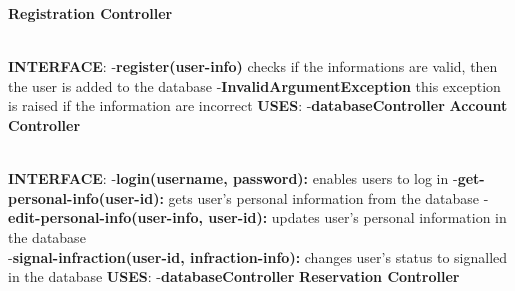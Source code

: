 \documentclass{article}
\begin{document}
\textbf{Registration Controller}\\
\begin{figure}[ht]
\end{figure}\\
\textbf{INTERFACE}: 
 \newline
-\textbf{register(user-info)} checks if the informations are valid, then the user is added to the database  
\newline
-\textbf{InvalidArgumentException} this exception is raised if the 	information are incorrect  
\newline
\textbf{USES}:   
\newline
-\textbf{databaseController}
\newpage
\textbf{Account Controller}\\
\begin{figure}[ht]
\end{figure}\\
\textbf{INTERFACE}: 
 \newline
-\textbf{login(username, password):} enables users to log in   
\newline
-\textbf{get-personal-info(user-id):} gets user's personal information from the database 
\newline
-\textbf{edit-personal-info(user-info, user-id):} updates user's personal information in the database \\
-\textbf{signal-infraction(user-id, infraction-info):} changes user's status to signalled in the database  
\newline
\textbf{USES}:   
\newline
-\textbf{databaseController}
\newpage
\textbf{Reservation Controller}\\
\begin{figure}[ht]
\end{figure}\\
\end{document}
